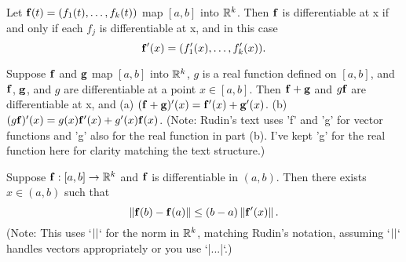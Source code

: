 \begin{theorem} %
  \label{thm:chap5:component_wise_diff}
  Let $\mathbf{f}(t) = (f_1(t), \dots, f_k(t))$ map $[a, b]$ into
  $\mathbb{R}^k$. Then $\mathbf{f}$ is differentiable at x if and only if each
  $f_j$ is differentiable at x, and in this case
  \[ \mathbf{f}'(x) = (f'_1(x), \dots, f'_k(x)). \]
\end{theorem}

\begin{theorem} %
  \label{thm:chap5:vector_deriv_props}
  Suppose $\mathbf{f}$ and $\mathbf{g}$ map $[a, b]$ into $\mathbb{R}^k$, $g$ is
  a real function defined on $[a, b]$, and $\mathbf{f}$, $\mathbf{g}$,
  and $g$ are differentiable at a point $x \in [a, b]$. Then
  $\mathbf{f}+\mathbf{g}$ and $g\mathbf{f}$ are differentiable at x, and
  (a) $(\mathbf{f}+\mathbf{g})'(x) = \mathbf{f}'(x) + \mathbf{g}'(x)$.
  (b) $(g\mathbf{f})'(x) = g(x)\mathbf{f}'(x) + g'(x)\mathbf{f}(x)$.
  (Note: Rudin's text uses 'f' and 'g' for vector functions and 'g'
    also for the real function in part (b). I've kept 'g' for the real
  function here for clarity matching the text structure.)
\end{theorem}


\begin{theorem} %
  \label{thm:chap5:vector_mvt_inequality}
  Suppose $\mathbf{f}: [a, b] \to \mathbb{R}^k$ and $\mathbf{f}$ is
  differentiable in $(a, b)$. Then there exists $x \in (a, b)$ such that
  \[ \left\lVert \mathbf{f}(b) - \mathbf{f}(a) \right\rVert \le (b - a) \left\lVert \mathbf{f}'(x) \right\rVert. \]
  (Note: This uses `$\left\lvert  \right\rvert$` for the norm in $\mathbb{R}^k$, matching
    Rudin's notation, assuming `$\left\lvert  \right\rvert$` handles vectors appropriately
  or you use `|...|`.)
\end{theorem}

